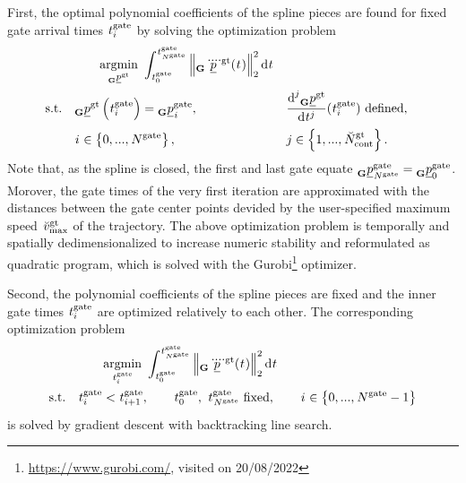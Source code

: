 \begin{itemize}
    First,
    the optimal polynomial coefficients of the spline pieces
    are found for fixed gate arrival times 
    $\timepnt[]{\gate}{i}{}{}$
    by solving the optimization problem
    \begin{align}
        &\qquad \argmin{\pos[]{\glotraj}{}{\grs}{}}
        \int_{\timepnt[]{\gate}{0}{}{}}^{\timepnt[]{\gate}{\num[]{\gate}{}{}{}}{}{}}
            \left\|
                \pos[\ddddot]{\glotraj}{}{\grs}{}(\timepnt[]{}{}{}{})
            \right\|^2_2
        \text d \timepnt[]{}{}{}{}
        \nonumber 
        \\
        \text{s.t.}\quad
        & \pos[]{\glotraj}{}{\grs}{}\left(\timepnt[]{\gate}{i}{}{}\right) = 
            \pos[]{\gate}{\idx[]{}{}{}{}}{\grs}{},
        &&
            \frac{\text d^j \pos[]{\glotraj}{}{\grs}{}}{\text d \timepnt[]{j}{}{}{}} 
            (\timepnt[]{\gate}{i}{}{}) \text{ defined},
        \nonumber \\
        & \idx[]{}{}{}{} \in \left\{0, ..., \num[]{\gate}{}{}{}\right\},
        && j \in \left\{1, ..., \num[\user]{\glotraj}{\text{cont}}{}{}\right\}.
    \end{align}
    Note that, as the spline is closed, 
    the first and last gate equate 
    $\pos[]{\gate}{\num[]{\gate}{}{}{}}{\grs}{} = \pos[]{\gate}{0}{\grs}{}$.
    Morover, the gate times of the very first iteration are 
    approximated with the distances between the gate center points
    devided by the user-specified maximum speed $\speed[\user]{\glotraj}{\mxm}{}{}$ of the trajectory.
    The above optimization problem
    is temporally and spatially dedimensionalized 
    to increase numeric stability and 
    reformulated as quadratic program,
    which is solved with the Gurobi\footnote{
        \url{https://www.gurobi.com/}, visited on 20/08/2022
    } optimizer.

    Second, the polynomial coefficients of the spline pieces 
    are fixed
    and the inner gate times
    $\timepnt[]{\gate}{i}{}{}$
    are optimized relatively to each other.
    The corresponding optimization problem
    \begin{align}
        &\qquad \argmin{\timepnt[]{\gate}{i}{}{}}
        \int_{\timepnt[]{\gate}{0}{}{}}^{\timepnt[]{\gate}{\num[]{\gate}{}{}{}}{}{}}
            \left\|
                \pos[\ddddot]{\glotraj}{}{\grs}{}(\timepnt[]{}{}{}{})
            \right\|^2_2
        \text d \timepnt[]{}{}{}{}
        \nonumber \\
        \text{s.t.}\quad
        & \timepnt[]{\gate}{i}{}{} < \timepnt[]{\gate}{i+1}{}{},
        \qquad
        \timepnt[]{\gate}{0}{}{},\ \timepnt[]{\gate}{\num[]{\gate}{}{}{}}{}{} \text{ fixed},
        \qquad
        \idx[]{}{}{}{} \in \left\{0, ..., \num[]{\gate}{}{}{} - 1 \right\}
    \end{align}
    is solved by gradient descent with backtracking line search.


\end{itemize}
